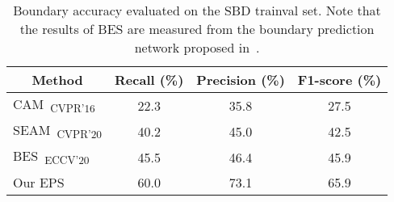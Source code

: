 \begin{table}[]
\centering
{\small
\begin{tabular}{@{}lccc@{}}
\toprule
\multicolumn{1}{c}{Method}                      & Recall (\%) & Precision (\%) & F1-score (\%) \\ \midrule
\multicolumn{1}{l}{CAM~\cite{zhou2016learning}\textsubscript{CVPR'16}} & 22.3        & 35.8           & 27.5           \\
\multicolumn{1}{l}{SEAM~\cite{wang2020self}\textsubscript{CVPR'20}}    & 40.2        & 45.0           & 42.5           \\
\multicolumn{1}{l}{BES~\cite{chen2020boundary}\textsubscript{ECCV'20}} & 45.5        & 46.4           & 45.9           \\
\multicolumn{1}{l}{Our EPS}                        & 60.0        & 73.1          & 65.9           \\ \bottomrule
\end{tabular}
}
\vspace{2mm}
\caption{Boundary accuracy evaluated on the SBD trainval set. Note that the results of BES are measured from the boundary prediction network proposed in~\cite{chen2020boundary}.} \vspace{-2mm}
\label{tab:boundary}
\end{table}